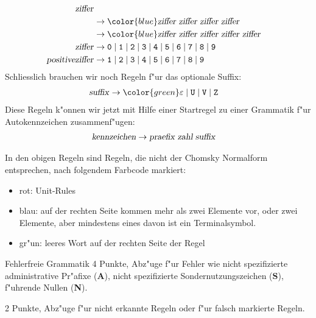 \begin{loesung}
\begin{teilaufgaben}
\begin{align*}
{\text{\textsl{ziffer}}}
\\
&\rightarrow
{\color{blue}
\text{\textsl{ziffer}}\;
\text{\textsl{ziffer}}\;
\text{\textsl{ziffer}}\;
\text{\textsl{ziffer}}}
\\
&\rightarrow
{\color{blue}
\text{\textsl{ziffer}}\;
\text{\textsl{ziffer}}\;
\text{\textsl{ziffer}}\;
\text{\textsl{ziffer}}\;
\text{\textsl{ziffer}}}
\\
\text{\textsl{ziffer}}
&\rightarrow
{\tt 0}\;|\;
{\tt 1}\;|\;
{\tt 2}\;|\;
{\tt 3}\;|\;
{\tt 4}\;|\;
{\tt 5}\;|\;
{\tt 6}\;|\;
{\tt 7}\;|\;
{\tt 8}\;|\;
{\tt 9}
\\
\text{\textsl{positiveziffer}}
&\rightarrow
{\tt 1}\;|\;
{\tt 2}\;|\;
{\tt 3}\;|\;
{\tt 4}\;|\;
{\tt 5}\;|\;
{\tt 6}\;|\;
{\tt 7}\;|\;
{\tt 8}\;|\;
{\tt 9}
\\
\end{align*}
Schliesslich brauchen wir noch Regeln f"ur das optionale Suffix:
\begin{align*}
\text{\textsl{suffix}}
&\rightarrow{\color{green}\varepsilon} \;|\;
{\tt U} \;|\;
{\tt V} \;|\;
{\tt Z}
\end{align*}
Diese Regeln k"onnen wir jetzt mit Hilfe einer Startregel zu einer
Grammatik f"ur Autokennzeichen zusammenf"ugen:
\begin{align*}
\text{\textsl{kennzeichen}}&\rightarrow
\text{\textsl{praefix}}\;\text{\textsl{zahl}}\;\text{\textsl{suffix}}
\end{align*}
\item In den obigen Regeln sind Regeln, die nicht der Chomsky Normalform
entsprechen, nach folgendem Farbcode markiert:
\begin{itemize}
\item {\color{red} rot}: Unit-Rules
\item {\color{blue} blau}: auf der rechten Seite kommen mehr als
zwei Elemente vor, oder zwei Elemente, aber mindestens eines davon
ist ein Terminalsymbol.
\item {\color{green} gr"un}: leeres Wort auf der rechten Seite der Regel
\qedhere
\end{itemize}
\end{teilaufgaben}
\end{loesung}

\begin{bewertung}
\begin{teilaufgaben}
\item Fehlerfreie Grammatik 4 Punkte, Abz"uge f"ur Fehler wie
nicht spezifizierte administrative Pr"afixe ({\bf A}), nicht spezifizierte
Sondernutzungszeichen ({\bf S}), f"uhrende Nullen ({\bf N}).
\item 2 Punkte, Abz"uge f"ur nicht erkannte Regeln oder f"ur falsch
markierte Regeln.
\end{teilaufgaben}
\end{bewertung}

